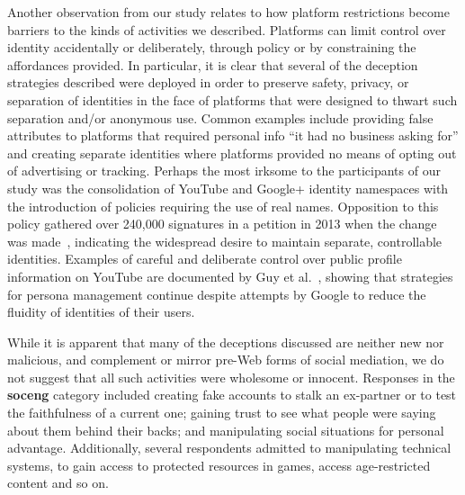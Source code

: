 \documentclass{sig-alternate}
\begin{document}

Another observation from our study relates to how platform restrictions become barriers to the kinds of activities we described. Platforms can limit control over identity accidentally or deliberately, through policy or by constraining the affordances provided. 
In particular, it is clear that several of the deception strategies described were deployed in order to preserve safety, privacy, or separation of identities in the face of platforms that were designed to thwart such separation and/or anonymous use. 
Common examples include providing false attributes to platforms that required personal info ``it had no business asking for'' and creating separate identities where platforms provided no means of opting out of advertising or tracking. 
Perhaps the most irksome to the participants of our study was the 
consolidation of YouTube and Google+ identity namespaces with the introduction of policies requiring the use of real names. 
Opposition to this policy gathered over 240,000 signatures in a petition in 2013 when the change was made~\cite{noplus}, indicating the widespread desire to maintain separate, controllable identities.  
Examples of careful and deliberate control over public profile information on YouTube are documented by Guy et al.~\cite{guy2014}, showing that strategies for persona management continue despite attempts by Google to reduce the fluidity of identities of their users.


While it is apparent that many of the deceptions discussed are neither new nor malicious, and complement or mirror pre-Web forms of social mediation, we do not suggest that all such activities were wholesome or innocent. Responses in the \textbf{soceng} category included creating fake accounts to stalk an ex-partner or to test the faithfulness of a current one; gaining trust to see what people were saying about them behind their backs; and manipulating social situations for personal advantage. Additionally, several respondents admitted to manipulating technical systems, to gain access to protected resources in games, access age-restricted content and so on. 
\end{document}

